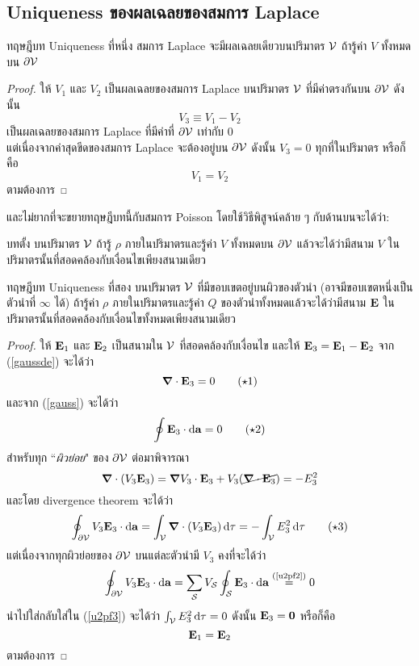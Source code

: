 \subsection{Uniqueness ของผลเฉลยของสมการ Laplace}
\begin{lawbox}{ทฤษฎีบท Uniqueness ที่หนึ่ง}
    สมการ Laplace จะมีผลเฉลยเดียวบนปริมาตร $\mathcal{V}$ ถ้ารู้ค่า $V$ ทั้งหมดบน $\partial\mathcal{V}$
\end{lawbox}
\begin{proof}
    ให้ $V_1$ และ $V_2$ เป็นผลเฉลยของสมการ Laplace บนปริมาตร $\mathcal{V}$ ที่มีค่าตรงกันบน $\partial\mathcal{V}$ ดังนั้น
    \[
    V_3\equiv V_1-V_2
    \]
    เป็นผลเฉลยของสมการ Laplace ที่มีค่าที่ $\partial\mathcal{V}$ เท่ากับ $0$\\
    แต่เนื่องจากค่าสุดขีดของสมการ Laplace จะต้องอยู่บน $\partial\mathcal{V}$ ดังนั้น $V_3=0$ ทุกที่ในปริมาตร หรือก็คือ
    \[
    V_1=V_2
    \]
    ตามต้องการ
\end{proof}
และไม่ยากที่จะขยายทฤษฎีบทนี้กับสมการ Poisson โดยใช้วิธีพิสูจน์คล้าย ๆ กับด้านบนจะได้ว่า:
\begin{corbox}{บทตั้ง}
    บนปริมาตร $\mathcal{V}$ ถ้ารู้ $\rho$ ภายในปริมาตรและรู้ค่า $V$ ทั้งหมดบน $\partial\mathcal{V}$ แล้วจะได้ว่ามีสนาม $V$ ในปริมาตรนั้นที่สอดคล้องกับเงื่อนไขเพียงสนามเดียว
\end{corbox}

\begin{lawbox}{ทฤษฎีบท Uniqueness ที่สอง}
    บนปริมาตร $\mathcal{V}$ ที่มีขอบเขตอยู่บนผิวของตัวนำ (อาจมีขอบเขตหนึ่งเป็นตัวนำที่ $\infty$ ได้) ถ้ารู้ค่า $\rho$ ภายในปริมาตรและรู้ค่า $Q$ ของตัวนำทั้งหมดแล้วจะได้ว่ามีสนาม $\mathbf{E}$ ในปริมาตรนั้นที่สอดคล้องกับเงื่อนไขทั้งหมดเพียงสนามเดียว
\end{lawbox}
\begin{proof}
    ให้ $\mathbf{E}_1$ และ $\mathbf{E}_2$ เป็นสนามใน $\mathcal{V}$ ที่สอดคล้องกับเงื่อนไข และให้ $\mathbf{E}_3=\mathbf{E}_1-\mathbf{E}_2$ จาก (\ref{gaussde}) จะได้ว่า
    \begin{equation}
        \boldsymbol{\nabla}\cdot\mathbf{E}_3=0\tag{$\star$1}
    \end{equation}
    และจาก (\ref{gauss}) จะได้ว่า
    \begin{equation}
        \oint\vb{E}_3\cdot\odif{\vb{a}}=0\tag{$\star$2}\label{u2pf2}
    \end{equation}
    สำหรับทุก ``\emph{ผิวย่อย}" ของ $\partial\mathcal{V}$ ต่อมาพิจารณา
    \[
    \boldsymbol{\nabla}\cdot(V_3\mathbf{E}_3)=\boldsymbol{\nabla} V_3\cdot\mathbf{E}_3+V_3(\cancel{\boldsymbol{\nabla}\cdot\mathbf{E}_3})=-E_3^2
    \]
    และโดย divergence theorem จะได้ว่า
    \begin{equation}
    \oint_{\del\vol}V_3\vb{E}_3\cdot\odif{\vb{a}}=\int_\vol\gd\cdot(V_3\vb{E}_3)\odif{\tau}=-\int_\vol E_3^2\odif{\tau}\tag{$\star$3}\label{u2pf3}
    \end{equation}
    แต่เนื่องจากทุกผิวย่อยของ $\partial\mathcal{V}$ บนแต่ละตัวนำมี $V_3$ คงที่จะได้ว่า
    \[
    \oint_{\del\vol}V_3\vb{E}_3\cdot\odif{\vb{a}}=\sum_{\txt{\sur}}V_\sur\oint_\sur\vb{E}_3\cdot\odif{\vb{a}}\overset{\text{(\ref{u2pf2})}}{=}0
    \]
    นำไปใส่กลับใส่ใน (\ref{u2pf3}) จะได้ว่า $\int_\vol E_3^2\odif{\tau}=0$ ดังนั้น $\mathbf{E}_3=\mathbf{0}$ หรือก็คือ
    \[
    \mathbf{E}_1=\mathbf{E}_2
    \]
    ตามต้องการ
\end{proof}

